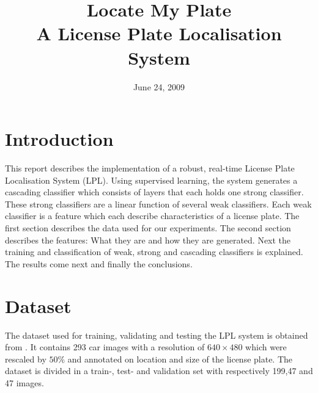 \documentclass[a4paper,11pt]{article}
\title{Locate My Plate \\ A License Plate Localisation System}
\date{June 24, 2009}
\begin{document}
\maketitle
\section*{Introduction}
This report describes the implementation of a robust, real-time License Plate
Localisation System (LPL). Using supervised learning, the system generates a
cascading classifier which consists of layers that each holds one strong
classifier. These strong classifiers are a linear function of several weak
classifiers. Each weak classifier is a feature which each describe
characteristics of a license plate. The first section describes the data used
for our experiments. The second section describes the features: What they are
and how they are generated.  Next the training and classification of weak,
strong and cascading classifiers is explained. The results come next and
finally the conclusions.

\section*{Dataset}
The dataset used for training, validating and testing the LPL system is obtained
from \cite{dlagnekov_dataset}. It contains 293 car images with a resolution of
$640\times480$ which were rescaled by $50\%$ and annotated on location and size of
the license plate. The dataset is divided in a train-, test- and validation set
with respectively 199,47 and 47 images.
\end{document}
